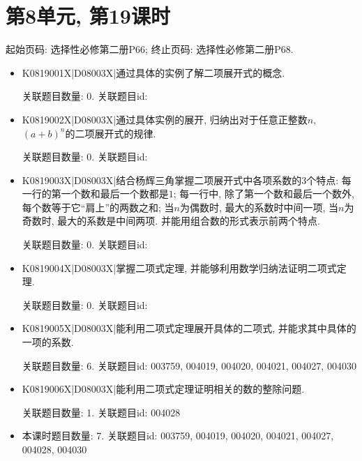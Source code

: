 \section*{第8单元, 第19课时}
起始页码: 选择性必修第二册P66; 终止页码: 选择性必修第二册P68.
\begin{itemize}
\item K0819001X|D08003X|通过具体的实例了解二项展开式的概念.

关联题目数量: 0. 关联题目id: 

\item K0819002X|D08003X|通过具体实例的展开, 归纳出对于任意正整数$n$, $(a+b)^n$的二项展开式的规律.

关联题目数量: 0. 关联题目id: 

\item K0819003X|D08003X|结合杨辉三角掌握二项展开式中各项系数的$3$个特点: 每一行的第一个数和最后一个数都是$1$; 每一行中, 除了第一个数和最后一个数外, 每个数等于它``肩上''的两数之和; 当$n$为偶数时, 最大的系数时中间一项, 当$n$为奇数时, 最大的系数是中间两项. 并能用组合数的形式表示前两个特点.

关联题目数量: 0. 关联题目id: 

\item K0819004X|D08003X|掌握二项式定理, 并能够利用数学归纳法证明二项式定理.

关联题目数量: 0. 关联题目id: 

\item K0819005X|D08003X|能利用二项式定理展开具体的二项式, 并能求其中具体的一项的系数.

关联题目数量: 6. 关联题目id: 003759, 004019, 004020, 004021, 004027, 004030

\item K0819006X|D08003X|能利用二项式定理证明相关的数的整除问题.

关联题目数量: 1. 关联题目id: 004028

\item 本课时题目数量: 7. 关联题目id: 003759, 004019, 004020, 004021, 004027, 004028, 004030

\end{itemize}

